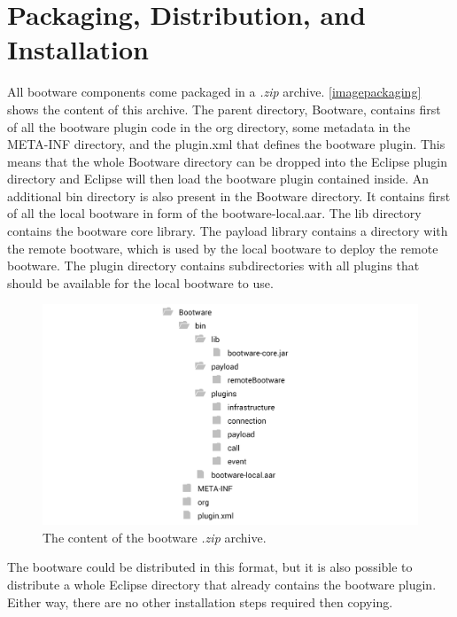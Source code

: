 \section{Packaging, Distribution, and Installation}

All bootware components come packaged in a \textit{.zip} archive.
\autoref{imagepackaging} shows the content of this archive.
The parent directory, Bootware, contains first of all the bootware plugin code in the org directory, some metadata in the META-INF directory, and the plugin.xml that defines the bootware plugin.
This means that the whole Bootware directory can be dropped into the Eclipse plugin directory and Eclipse will then load the bootware plugin contained inside.
An additional bin directory is also present in the Bootware directory.
It contains first of all the local bootware in form of the bootware-local.aar.
The lib directory contains the bootware core library.
The payload library contains a directory with the remote bootware, which is used by the local bootware to deploy the remote bootware.
The plugin directory contains subdirectories with all plugins that should be available for the local bootware to use.

\begin{figure}[!htbp]
	\centering
	\includegraphics[resolution=600]{implementation/assets/packaging}
	\caption{The content of the bootware \textit{.zip} archive.}
	\label{imagepackaging}
\end{figure}

The bootware could be distributed in this format, but it is also possible to distribute a whole Eclipse directory that already contains the bootware plugin.
Either way, there are no other installation steps required then copying.
